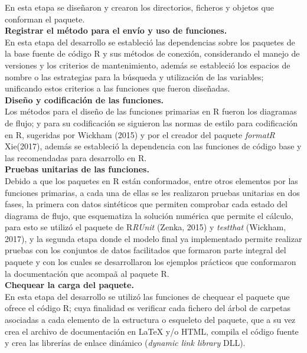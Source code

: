 En esta etapa se dise\~naron y crearon los directorios, ficheros y objetos que conforman el paquete.\\ 

\noindent
\textbf{Registrar el m\'etodo para el env\'io y uso de funciones.}\\

En esta etapa del desarrollo se estableci\'o las dependencias sobre los paquetes de la base fuente de c\'odigo R y sus m\'etodos de conexi\'on, considerando el manejo de versiones y los criterios de mantenimiento, adem\'as  se estableci\'o  los espacios de nombre o las estrategias para la b\'usqueda y utilizaci\'on de las variables; unificando estos criterios a las funciones que fueron dise\~nadas.\\

\noindent
\textbf{Dise\~no y codificaci\'on de las funciones.}\\

Los m\'etodos para el dise\~no de las funciones primarias en R fueron los diagramas de flujo; y para su codificaci\'on se siguieron las normas de estilo para codificaci\'on en R, sugeridas por Wickham (2015) y por el creador del paquete \emph{formatR} Xie(2017), adem\'as se estableci\'o la dependencia con las funciones de c\'odigo base y las recomendadas para desarrollo en R.\\

\noindent
\textbf{Pruebas unitarias de las funciones.}\\

Debido a que los paquetes en R est\'an conformados, entre otros elementos por las funciones primarias, a cada una de ellas se les realizaron pruebas unitarias en dos fases, la primera con datos sint\'eticos que permiten comprobar cada estado del diagrama de flujo, que esquematiza la soluci\'on num\'erica que permite el c\'alculo, para esto se utiliz\'o el paquete de R\emph{RUnit} (Zenka, 2015) y \emph{testthat} (Wickham, 2017), y la segunda etapa donde el modelo final ya implementado permite realizar pruebas con los conjuntos de datos facilitados que formaron parte integral del paquete y con los cuales se desarrollaron los ejemplos pr\'acticos que conformaron la documentaci\'on que acompa\~a al paquete R.\\


\newpage  
\noindent
\textbf{Chequear la carga del paquete.}\\

En esta etapa del desarrollo se utiliz\'o las funciones de chequear el paquete que ofrece el c\'odigo R; cuya finalidad es verificar cada fichero del \'arbol de carpetas asociadas a cada elemento de la estructura o esqueleto del paquete, que a su vez crea el archivo de documentaci\'on en LaTeX y/o HTML, compila el c\'odigo fuente y crea las librerías de enlace din\'amico (\emph{dynamic link library} DLL).\\  

